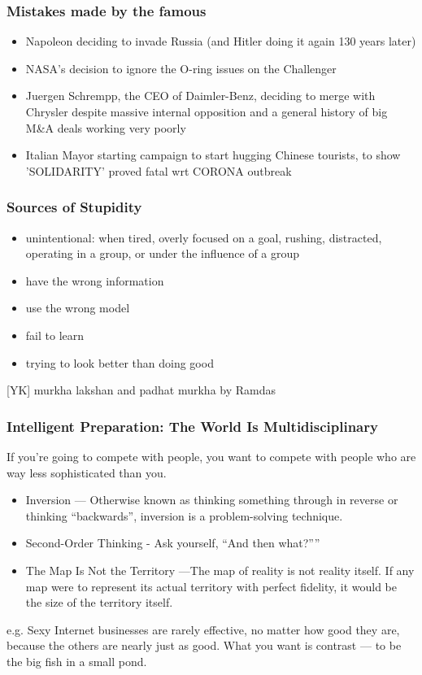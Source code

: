 \begin{frame}[fragile]\frametitle{Mistakes made by the famous}

\begin{itemize}
\item Napoleon deciding to invade Russia (and Hitler doing it again 130 years later)
\item NASA’s decision to ignore the O-ring issues on the Challenger
\item Juergen Schrempp, the CEO of Daimler-Benz, deciding to merge with Chrysler despite massive internal opposition and a general history of big M\&A deals working very poorly
\item  [YK] Italian Mayor starting campaign to start hugging Chinese tourists, to show 'SOLIDARITY' proved fatal wrt CORONA outbreak
\end{itemize}

\end{frame}


\begin{frame}[fragile]\frametitle{Sources of Stupidity}
\begin{itemize}
\item unintentional: when tired, overly focused on a goal, rushing, distracted, operating in a group, or under the influence of a group
\item have the wrong information
\item use the wrong model
\item fail to learn
\item trying to look better than doing good
\end{itemize}

[YK] murkha lakshan and padhat murkha by Ramdas

\end{frame}


\begin{frame}[fragile]\frametitle{Intelligent Preparation: The World Is Multidisciplinary}


If you're going to compete with people, you want to compete with people who are way less sophisticated than you.

\begin{itemize}
\item Inversion — Otherwise known as thinking something through in reverse or thinking ``backwards'', inversion is a problem-solving technique.
\item Second-Order Thinking - Ask yourself, ``And then what?”''
\item The Map Is Not the Territory —The map of reality is not reality itself. If any map were to represent its actual territory with perfect fidelity, it would be the size of the territory itself.
\end{itemize}

e.g. Sexy Internet businesses are rarely effective, no matter how good they are, because the others are nearly just as good. What you want is contrast — to be the big fish in a small pond.
\end{frame}

